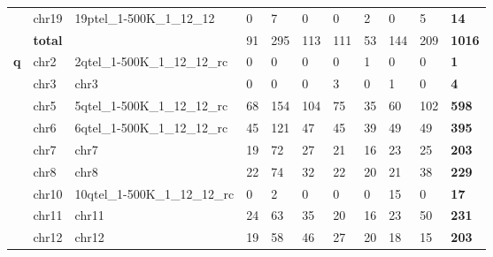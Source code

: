 \begin{samepage}
\begin{table}[h!]
\begin{tabular}{lllllllllll}
\textbf{}      & chr19               & 19ptel\_1-500K\_1\_12\_12       & 0              & 7              & 0              & 0              & 2              & 0              & 5              & \textbf{14}    \\
\textbf{}      & \textbf{total}      & \textbf{}                       & 91             & 295            & 113            & 111            & 53             & 144            & 209            & \textbf{1016}  \\
\textbf{q}     & chr2                & 2qtel\_1-500K\_1\_12\_12\_rc    & 0              & 0              & 0              & 0              & 1              & 0              & 0              & \textbf{1}     \\
\textbf{}      & chr3                & chr3                            & 0              & 0              & 0              & 3              & 0              & 1              & 0              & \textbf{4}     \\
\textbf{}      & chr5                & 5qtel\_1-500K\_1\_12\_12\_rc    & 68             & 154            & 104            & 75             & 35             & 60             & 102            & \textbf{598}   \\
\textbf{}      & chr6                & 6qtel\_1-500K\_1\_12\_12\_rc    & 45             & 121            & 47             & 45             & 39             & 49             & 49             & \textbf{395}   \\
\textbf{}      & chr7                & chr7                            & 19             & 72             & 27             & 21             & 16             & 23             & 25             & \textbf{203}   \\
\textbf{}      & chr8                & chr8                            & 22             & 74             & 32             & 22             & 20             & 21             & 38             & \textbf{229}   \\
\textbf{}      & chr10               & 10qtel\_1-500K\_1\_12\_12\_rc   & 0              & 2              & 0              & 0              & 0              & 15             & 0              & \textbf{17}    \\
\textbf{}      & chr11               & chr11                           & 24             & 63             & 35             & 20             & 16             & 23             & 50             & \textbf{231}   \\
\textbf{}      & chr12               & chr12                           & 19             & 58             & 46             & 27             & 20             & 18             & 15             & \textbf{203}   \\

\end{tabular}
\end{table}
\end{samepage}
